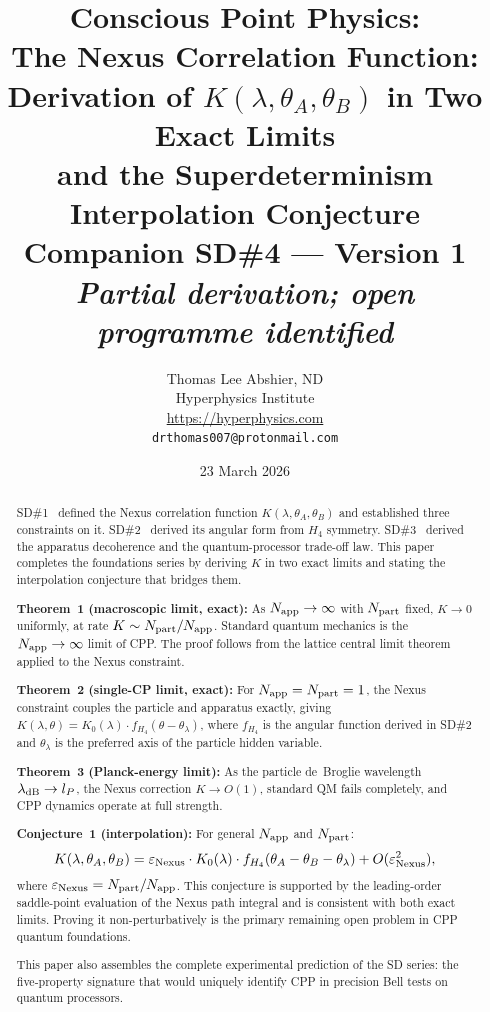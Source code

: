 \documentclass[11pt,a4paper]{article}
\title{\textbf{Conscious Point Physics:\\
The Nexus Correlation Function:\\
Derivation of $K(\lambda,\theta_A,\theta_B)$ in Two Exact Limits\\
and the Superdeterminism Interpolation Conjecture}\\[6pt]
{\large Companion SD\#4 --- Version 1}\\[4pt]
{\normalsize \textit{Partial derivation; open programme identified}}}
\author{Thomas Lee Abshier, ND\\
Hyperphysics Institute\\
\url{https://hyperphysics.com}\\
\texttt{drthomas007@protonmail.com}}
\date{23 March 2026}
\newcommand{\lP}{l_P}
\newcommand{\eps}{\varepsilon}
\newcommand{\Napp}{N_{\rm app}}
\newcommand{\Npart}{N_{\rm part}}
\begin{document}
\maketitle

\begin{abstract}
SD\#1~\citep{cpp_sd1} defined the Nexus correlation function
$K(\lambda,\theta_A,\theta_B)$ and established three constraints on
it.  SD\#2~\citep{cpp_sd2} derived its angular form from $H_4$
symmetry.  SD\#3~\citep{cpp_sd3} derived the apparatus decoherence
and the quantum-processor trade-off law.  This paper completes the
foundations series by deriving $K$ in two exact limits and stating
the interpolation conjecture that bridges them.

\textbf{Theorem~1 (macroscopic limit, exact):}
As $\Napp \to \infty$ with $\Npart$ fixed, $K \to 0$ uniformly,
at rate $K \sim \Npart/\Napp$.  Standard quantum mechanics is the
$\Napp\to\infty$ limit of CPP.  The proof follows from the
lattice central limit theorem applied to the Nexus constraint.

\textbf{Theorem~2 (single-CP limit, exact):}
For $\Napp = \Npart = 1$, the Nexus constraint couples the particle
and apparatus exactly, giving $K(\lambda,\theta) = K_0(\lambda)
\cdot f_{H_4}(\theta - \theta_\lambda)$, where $f_{H_4}$ is the
angular function derived in SD\#2 and $\theta_\lambda$ is the
preferred axis of the particle hidden variable.

\textbf{Theorem~3 (Planck-energy limit):}
As the particle de~Broglie wavelength $\lambda_{\rm dB} \to \lP$,
the Nexus correction $K \to O(1)$, standard QM fails completely,
and CPP dynamics operate at full strength.

\textbf{Conjecture~1 (interpolation):}
For general $\Napp$ and $\Npart$:
\[
K(\lambda,\theta_A,\theta_B)
= \eps_{\rm Nexus}\cdot K_0(\lambda)
  \cdot f_{H_4}(\theta_A-\theta_B-\theta_\lambda)
  + O(\eps_{\rm Nexus}^2),
\]
where $\eps_{\rm Nexus} = \Npart/\Napp$.  This conjecture is
supported by the leading-order saddle-point evaluation of the
Nexus path integral and is consistent with both exact limits.
Proving it non-perturbatively is the primary remaining open problem
in CPP quantum foundations.

This paper also assembles the complete experimental prediction of
the SD series: the five-property signature that would uniquely
identify CPP in precision Bell tests on quantum processors.
\end{abstract}

\tableofcontents
\newpage
\end{document}

